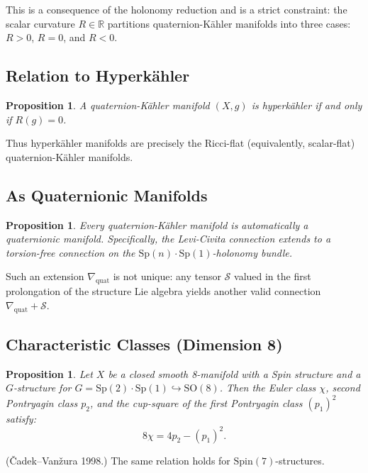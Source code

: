 \documentclass[12pt]{article}
\theoremstyle{definition}
\theoremstyle{plain}
\newtheorem{proposition}[definition]{Proposition}
\newcommand{\RR}{\mathbb{R}}
\newcommand{\Sp}{\mathrm{Sp}}
\newcommand{\SO}{\mathrm{SO}}
\newcommand{\Spin}{\mathrm{Spin}}
\begin{document}
This is a consequence of the holonomy reduction and is a strict constraint: the scalar curvature $R \in \RR$ partitions quaternion-K\"{a}hler manifolds into three cases: $R > 0$, $R = 0$, and $R < 0$.

\subsection{Relation to Hyperk\"{a}hler}

\begin{proposition}
A quaternion-K\"{a}hler manifold $(X, g)$ is hyperk\"{a}hler if and only if $R(g) = 0$.
\end{proposition}

Thus hyperk\"{a}hler manifolds are precisely the Ricci-flat (equivalently, scalar-flat) quaternion-K\"{a}hler manifolds.

\subsection{As Quaternionic Manifolds}

\begin{proposition}
Every quaternion-K\"{a}hler manifold is automatically a quaternionic manifold. Specifically, the Levi-Civita connection extends to a torsion-free connection on the $\Sp(n) \cdot \Sp(1)$-holonomy bundle.
\end{proposition}

Such an extension $\nabla_{\mathrm{quat}}$ is not unique: any tensor $\mathcal{S}$ valued in the first prolongation of the structure Lie algebra yields another valid connection $\nabla_{\mathrm{quat}} + \mathcal{S}$.

\subsection{Characteristic Classes (Dimension 8)}

\begin{proposition}
Let $X$ be a closed smooth 8-manifold with a Spin structure and a $G$-structure for $G = \Sp(2) \cdot \Sp(1) \hookrightarrow \SO(8)$. Then the Euler class $\chi$, second Pontryagin class $p_2$, and the cup-square of the first Pontryagin class $(p_1)^2$ satisfy:
\[
8\chi = 4p_2 - (p_1)^2.
\]
\end{proposition}

({\v C}adek--Van{\v z}ura 1998.) The same relation holds for $\Spin(7)$-structures.

\end{document}
